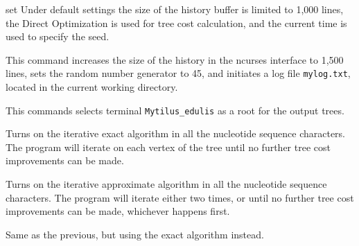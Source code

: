 \begin{command}{set}{}
        {Under default settings the size of the history buffer is limited to
        1,000 lines, the Direct Optimization is used for tree cost calculation,
        and the current time is used to specify the seed.}

    \begin{poyexamples}
            {This command increases the size of the history in the ncurses
            interface to 1,500 lines, sets the random number generator to 45,
            and initiates a log file \texttt{mylog.txt}, located in the current
            working directory.}
            
            {This commands selects terminal \texttt{Mytilus\_edulis} as a root
            for the output trees.}
            
            {Turns on the iterative exact algorithm in all the nucleotide
            sequence characters. The program will iterate on each vertex of the
            tree until no further tree cost improvements can be made.}

            {Turns on the iterative approximate algorithm in all the nucleotide
            sequence characters. The program will iterate either two times, or
            until no further tree cost improvements can be made, whichever
            happens first.}

            {Same as the previous, but using the exact algorithm instead.}
     \end{poyexamples}
     
	\begin{poyalso}
	\end{poyalso}

\end{command}

